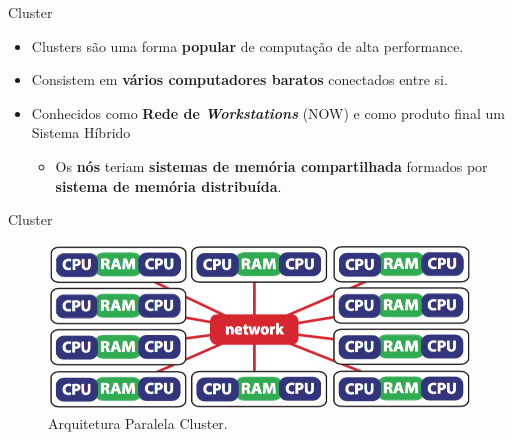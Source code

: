 		    









\begin{frame}{Cluster}
	\begin{itemize}
		\item Clusters são uma forma \textbf{popular} de computação de alta performance.
		\item Consistem em \textbf{vários computadores baratos} conectados entre si.
		\item Conhecidos como \textbf{Rede de \textit{Workstations}} (NOW) e como produto final um Sistema Híbrido
		\begin{itemize}
			\item Os \textbf{nós} teriam \textbf{sistemas de memória compartilhada} formados por \textbf{sistema de memória distribuída}.
		\end{itemize}
	
	\end{itemize}

\end{frame}


\begin{frame}{Cluster}
    \begin{figure}[h]
    	\centering
    	\includegraphics[width=1\textwidth]{img/tobias/cluster.png}
    	\caption{Arquitetura Paralela Cluster.}
    	\label{fig:ccnuma}
    \end{figure}

\end{frame}


